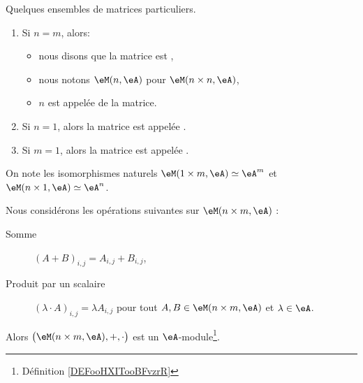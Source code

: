 \begin{definition}
	Quelques ensembles de matrices particuliers.
	\begin{enumerate}
		\item Si \( n=m\), alors:
		      \begin{itemize}
			      \item nous disons que la matrice est ,
			      \item nous notons \( \eM(n,\eA)\) pour \( \eM(n\times n,\eA)\),
			      \item \( n \) est appelée  de la matrice.
		      \end{itemize}
		\item Si \( n = 1 \), alors la matrice est appelée .
		\item Si \( m = 1 \), alors la matrice est appelée .
	\end{enumerate}
\end{definition}

\begin{normaltext}
	On note les isomorphismes naturels \( \eM(1\times m,\eA) \simeq \eA^m\) et \( \eM(n\times 1,\eA) \simeq \eA^n\).
\end{normaltext}

\begin{lemmaDef}        \label{LEMooYWTEooQyLxKv}
	Nous considérons les opérations suivantes sur \( \eM(n\times m, \eA)\) :
	\begin{description}
		\item[Somme] \( (A+B)_{i,j}=A_{i,j}+B_{i,j}\),
		\item[Produit par un scalaire] \( (\lambda \cdot A)_{i,j}=\lambda A_{i,j}\) pour tout \( A,B\in \eM(n\times m,\eA ) \) et \( \lambda\in \eA \).
	\end{description}
	Alors \( \big( \eM(n\times m, \eA), +,\cdot \big)\) est un \( \eA\)-module\footnote{Définition \ref{DEFooHXITooBFvzrR}}.
\end{lemmaDef}

